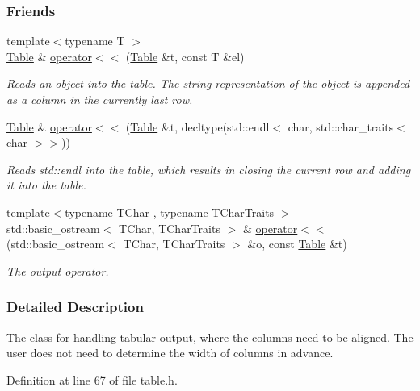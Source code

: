 \subsubsection*{Friends}
\begin{DoxyCompactItemize}
\item 
{\footnotesize template$<$typename T $>$ }\\\hyperlink{structTable}{Table} \& \hyperlink{structTable_ab2f038ef958603508282d43087ec366c}{operator$<$$<$} (\hyperlink{structTable}{Table} \&t, const T \&el)
\begin{DoxyCompactList}\small\item\em Reads an object into the table. The string representation of the object is appended as a column in the currently last row. \end{DoxyCompactList}\item 
\hyperlink{structTable}{Table} \& \hyperlink{structTable_a7f0695198091818a2d1568f63270c998}{operator$<$$<$} (\hyperlink{structTable}{Table} \&t, decltype(std\+::endl$<$ char, std\+::char\+\_\+traits$<$ char $>$$>$))
\begin{DoxyCompactList}\small\item\em Reads {\ttfamily std\+::endl} into the table, which results in closing the current row and adding it into the table. \end{DoxyCompactList}\item 
{\footnotesize template$<$typename T\+Char , typename T\+Char\+Traits $>$ }\\std\+::basic\+\_\+ostream$<$ T\+Char, T\+Char\+Traits $>$ \& \hyperlink{structTable_af7fb0a93919213bbe6101d2c8de706e3}{operator$<$$<$} (std\+::basic\+\_\+ostream$<$ T\+Char, T\+Char\+Traits $>$ \&o, const \hyperlink{structTable}{Table} \&t)
\begin{DoxyCompactList}\small\item\em The output operator. \end{DoxyCompactList}\end{DoxyCompactItemize}


\subsubsection{Detailed Description}
The class for handling tabular output, where the columns need to be aligned. The user does not need to determine the width of columns in advance. 

Definition at line 67 of file table.\+h.



